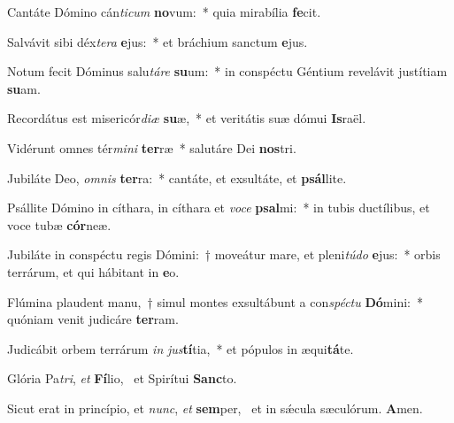 \item Cantáte Dómino cán\textit{ti}\textit{cum} \textbf{no}vum:~* quia mirabília \textbf{fe}cit.
\item Salvávit sibi déx\textit{te}\textit{ra} \textbf{e}jus:~* et bráchium sanctum \textbf{e}jus.
\item Notum fecit Dóminus salu\textit{tá}\textit{re} \textbf{su}um:~* in conspéctu Géntium revelávit justítiam \textbf{su}am.
\item Recordátus est misericór\textit{di}\textit{æ} \textbf{su}æ,~* et veritátis suæ dómui \textbf{Is}raël.
\item Vidérunt omnes tér\textit{mi}\textit{ni} \textbf{ter}ræ~* salutáre Dei \textbf{nos}tri.
\item Jubiláte Deo, \textit{om}\textit{nis} \textbf{ter}ra:~* cantáte, et exsultáte, et \textbf{psál}lite.
\item Psállite Dómino in cíthara, in cíthara et \textit{vo}\textit{ce} \textbf{psal}mi:~* in tubis ductílibus, et voce tubæ \textbf{cór}neæ.
\item Jubiláte in conspéctu regis Dómini:~† moveátur mare, et pleni\textit{tú}\textit{do} \textbf{e}jus:~* orbis terrárum, et qui hábitant in \textbf{e}o.
\item Flúmina plaudent manu,~† simul montes exsultábunt a con\textit{spéc}\textit{tu} \textbf{Dó}mini:~* quóniam venit judicáre \textbf{ter}ram.
\item Judicábit orbem terrárum \textit{in} \textit{jus}\textbf{tí}tia,~* et pópulos in æqui\textbf{tá}te.
\item Glória Pa\textit{tri}, \textit{et} \textbf{Fí}lio,~\psstar{} et Spirítui \textbf{Sanc}to.
\item Sicut erat in princípio, et \textit{nunc}, \textit{et} \textbf{sem}per,~\psstar{} et in sǽcula sæculórum. \textbf{A}men.